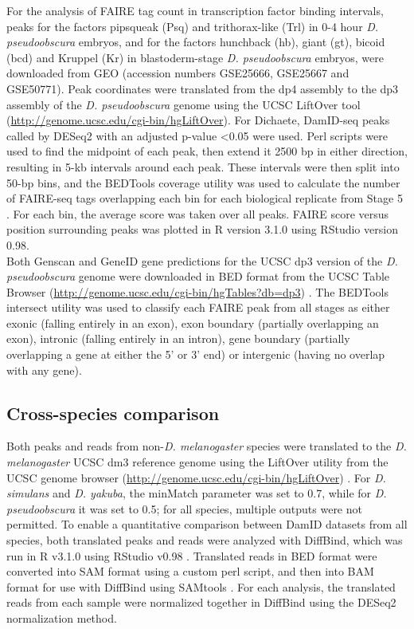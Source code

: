For the analysis of FAIRE tag count in transcription factor binding intervals, peaks for the factors pipsqueak (Psq) and trithorax-like (Trl) in 0-4 hour \emph{D. pseudoobscura} embryos, and for the factors hunchback (hb), giant (gt), bicoid (bcd) and Kruppel (Kr) in blastoderm-stage \emph{D. pseudoobscura} embryos, were downloaded from GEO (accession numbers GSE25666, GSE25667 and GSE50771). Peak coordinates were translated from the dp4 assembly to the dp3 assembly of the \emph{D. pseudoobscura} genome using the UCSC LiftOver tool (\url{http://genome.ucsc.edu/cgi-bin/hgLiftOver}). For Dichaete, DamID-seq peaks called by DESeq2 with an adjusted p-value \textless 0.05 were used. Perl scripts were used to find the midpoint of each peak, then extend it 2500 bp in either direction, resulting in 5-kb intervals around each peak. These intervals were then split into 50-bp bins, and the BEDTools coverage utility was used to calculate the number of FAIRE-seq tags overlapping each bin for each biological replicate from Stage 5 \citep{quinlan_bedtools:_2010}. For each bin, the average score was taken over all peaks. FAIRE score versus position surrounding peaks was plotted in R version 3.1.0 using RStudio version 0.98.\\

Both Genscan and GeneID gene predictions for the UCSC dp3 version of the \emph{D. pseudoobscura} genome were downloaded in BED format from the UCSC Table Browser (\url{http://genome.ucsc.edu/cgi-bin/hgTables?db=dp3}) \citep{burge_prediction_1997,karolchik_ucsc_2004, karolchik_ucsc_2014,parra_geneid_2000}. The BEDTools intersect utility \citep{quinlan_bedtools:_2010} was used to classify each FAIRE peak from all stages as either exonic (falling entirely in an exon), exon boundary (partially overlapping an exon), intronic (falling entirely in an intron), gene boundary (partially overlapping a gene at either the 5' or 3' end) or intergenic (having no overlap with any gene).

\subsection{Cross-species comparison}
Both peaks and reads from non-\emph{D. melanogaster} species were translated to the \emph{D. melanogaster} UCSC dm3 reference genome using the LiftOver utility from the UCSC genome browser (\url{http://genome.ucsc.edu/cgi-bin/hgLiftOver}) \citep{bardet_computational_2011}. For \emph{D. simulans} and \emph{D. yakuba}, the minMatch parameter was set to 0.7, while for \emph{D. pseudoobscura} it was set to 0.5; for all species, multiple outputs were not permitted. To enable a quantitative comparison between DamID datasets from all species, both translated peaks and reads were analyzed with DiffBind, which was run in R v3.1.0 using RStudio v0.98 \citep{ross-innes_differential_2012}. Translated reads in BED format were converted into SAM format using a custom perl script, and then into BAM format for use with DiffBind using SAMtools \citep{li_sequence_2009}. For each analysis, the translated reads from each sample were normalized together in DiffBind using the DESeq2 normalization method. 


